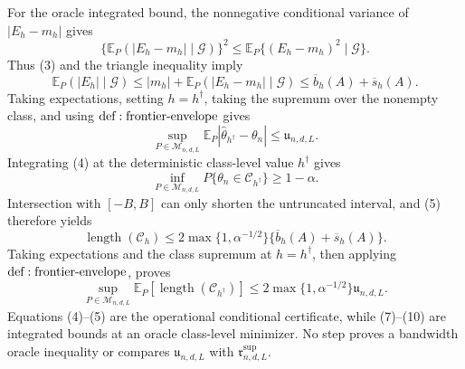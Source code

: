 For the oracle integrated bound, the nonnegative conditional variance of \(|E_h-m_h|\) gives
\[
 \{\mathbb E_P(|E_h-m_h|\mid\mathcal G)\}^2
 \leq\mathbb E_P\{(E_h-m_h)^2\mid\mathcal G\}.
\]
Thus (3) and the triangle inequality imply
\[
 \mathbb E_P(|E_h|\mid\mathcal G)
 \leq |m_h|+\mathbb E_P(|E_h-m_h|\mid\mathcal G)
 \leq\overline b_h(A)+\overline s_h(A).
\tag{6}
\]
Taking expectations, setting \(h=h^\dagger\), taking the supremum over the nonempty class, and using \({\rm def:frontier\text{-}envelope}\) gives
\[
 \sup_{P\in\mathcal M_{n,d,L}}
 \mathbb E_P|\widehat\theta_{h^\dagger}-\theta_n|
 \leq\mathfrak u_{n,d,L}.
\tag{7}
\]
Integrating (4) at the deterministic class-level value \(h^\dagger\) gives
\[
 \inf_{P\in\mathcal M_{n,d,L}}
 P\{\theta_n\in\mathcal C_{h^\dagger}\}\geq1-\alpha.
\tag{8}
\]
Intersection with \([-B,B]\) can only shorten the untruncated interval, and (5) therefore yields
\[
 \operatorname{length}(\mathcal C_h)
 \leq2\max\{1,\alpha^{-1/2}\}
 \{\overline b_h(A)+\overline s_h(A)\}.
\tag{9}
\]
Taking expectations and the class supremum at \(h=h^\dagger\), then applying \({\rm def:frontier\text{-}envelope}\), proves
\[
 \sup_{P\in\mathcal M_{n,d,L}}
 \mathbb E_P[\operatorname{length}(\mathcal C_{h^\dagger})]
 \leq2\max\{1,\alpha^{-1/2}\}\mathfrak u_{n,d,L}.
\tag{10}
\]
Equations (4)--(5) are the operational conditional certificate, while (7)--(10) are integrated bounds at an oracle class-level minimizer.  No step proves a bandwidth oracle inequality or compares \(\mathfrak u_{n,d,L}\) with \(\mathfrak r^{\mathrm{sup}}_{n,d,L}\).
